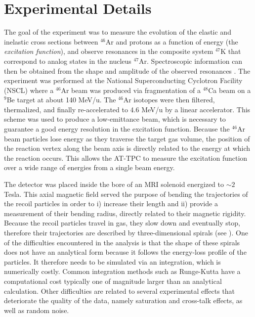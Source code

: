 \documentclass[preprint,12pt]{elsarticle}
\begin{document}
\section{Experimental Details} 
\label{Sec:Exp}
The goal of the experiment was to measure the evolution of the elastic and inelastic cross sections between $^{46}$Ar and protons as a function of energy (the {\em excitation function}), and observe resonances in the composite system $^{47}$K that correspond to analog states in the nucleus $^{47}$Ar. Spectroscopic information can then be obtained from the shape and amplitude of the observed resonances \cite{Bradt2018}. 
The experiment was performed at the National Superconducting Cyclotron Facility (NSCL) where a $^{46}$Ar beam was produced via fragmentation of a $^{48}$Ca beam on a $^9$Be target at about 140 MeV/u. The $^{46}$Ar isotopes were then filtered, thermalized, and finally re-accelerated to 4.6 MeV/u by a linear accelerator. This scheme was used to produce a low-emittance beam, which is necessary to guarantee a good energy resolution in the excitation function. Because the  $^{46}$Ar beam particles lose energy as they traverse the target gas volume, the position of the reaction vertex along the beam axis is directly related to the energy at which the reaction occurs. This allows the AT-TPC to measure the excitation function over a wide range of energies from a single beam energy.

The detector was placed inside the bore of an MRI solenoid energized to $\sim 2$ Tesla. This axial magnetic field served the purpose of bending the trajectories of the recoil particles in order to i) increase their length and ii) provide a measurement of their bending radius, directly related to their magnetic rigidity. Because the recoil particles travel in gas, they slow down and eventually stop, therefore their trajectories are described by three-dimensional spirals (see \cite{Bradt2017}). One of the difficulties encountered in the analysis is that the shape of these spirals does not have an analytical form because it follows the energy-loss profile of the particles. It therefore needs to be simulated via an integration, which is numerically costly. Common integration methods such as Runge-Kutta have a computational cost typically one of magnitude larger than an analytical calculation. Other difficulties are related to several experimental effects that deteriorate the quality of the data, namely saturation and cross-talk effects, as well as random noise. 
\end{document}
